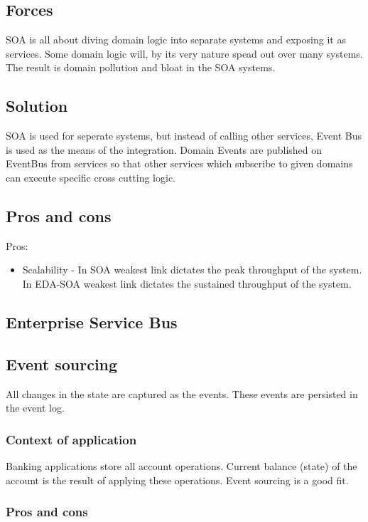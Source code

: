 \documentclass[12pt, a4paper]{article}
\begin{document}
\subsection{Forces}
SOA is all about diving domain logic into separate systems and exposing it as services. Some domain logic will, by its very nature spead out over many systems. The result is domain pollution and bloat in the SOA systems.

\subsection{Solution}
SOA is used for seperate systems, but instead of calling other services, Event Bus is used as the means of the integration. Domain Events are published on EventBus from services so that other services which subscribe to given domains can execute specific cross cutting logic.

\subsection{Pros and cons}
Pros:
\begin{itemize}
  \item Scalability - In SOA weakest link dictates the peak throughput of the system. In EDA-SOA weakest link dictates the sustained throughput of the system. 
\end{itemize}


\subsection{Enterprise Service Bus}


\subsection{Event sourcing}
All changes in the state are captured as the events. These events are persisted in the event log.

\subsubsection{Context of application}
Banking applications store all account operations. Current balance (state) of the account is the result of applying these operations. Event sourcing is a good fit.

\subsubsection{Pros and cons}
\end{document}
